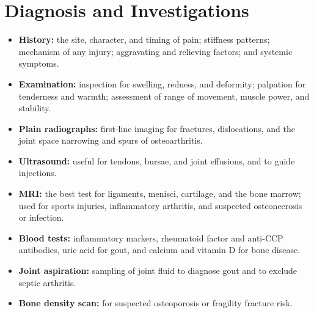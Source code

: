\section*{Diagnosis and Investigations}
\begin{itemize}
    \item \textbf{History:} the site, character, and timing of pain; stiffness patterns; mechanism of any injury; aggravating and relieving factors; and systemic symptoms.
    \item \textbf{Examination:} inspection for swelling, redness, and deformity; palpation for tenderness and warmth; assessment of range of movement, muscle power, and stability.
    \item \textbf{Plain radiographs:} first-line imaging for fractures, dislocations, and the joint space narrowing and spurs of osteoarthritis.
    \item \textbf{Ultrasound:} useful for tendons, bursae, and joint effusions, and to guide injections.
    \item \textbf{MRI:} the best test for ligaments, menisci, cartilage, and the bone marrow; used for sports injuries, inflammatory arthritis, and suspected osteonecrosis or infection.
    \item \textbf{Blood tests:} inflammatory markers, rheumatoid factor and anti-CCP antibodies, uric acid for gout, and calcium and vitamin D for bone disease.
    \item \textbf{Joint aspiration:} sampling of joint fluid to diagnose gout and to exclude septic arthritis.
    \item \textbf{Bone density scan:} for suspected osteoporosis or fragility fracture risk.
\end{itemize}


